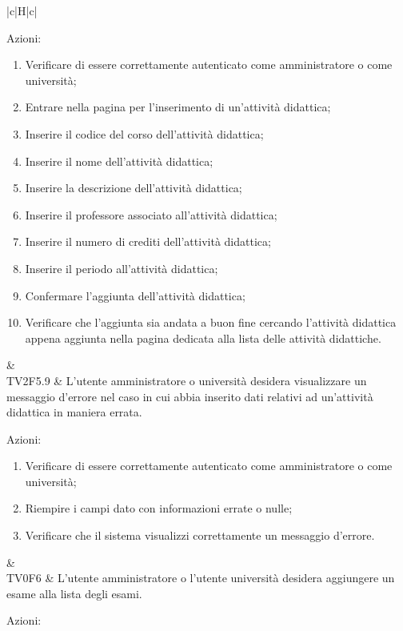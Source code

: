 \begin{longtable}{|c|H|c|}
\begin{flushleft}
		Azioni:\newline
		\end{flushleft} 
		\begin{enumerate}
			\item Verificare di essere correttamente autenticato come amministratore o come università;
			\item Entrare nella pagina per l'inserimento di un'attività didattica;
			\item Inserire il codice del corso dell'attività didattica;
			\item Inserire il nome dell'attività didattica;
			\item Inserire la descrizione dell'attività didattica;
			\item Inserire il professore associato all'attività didattica;
			\item Inserire il numero di crediti dell'attività didattica;
			\item Inserire il periodo all'attività didattica;
			\item Confermare l'aggiunta dell'attività didattica;
			\item Verificare che l'aggiunta sia andata a buon fine cercando l'attività didattica appena aggiunta nella pagina dedicata alla lista delle attività didattiche.
		\end{enumerate} & \Ts \\
	\hline
	TV2F5.9 &  L'utente amministratore o università desidera visualizzare un messaggio d'errore nel caso in cui abbia inserito dati relativi ad un'attività didattica in maniera errata. \newline \begin{flushleft}
		Azioni:\newline
	\end{flushleft} 
	\begin{enumerate}
		\item Verificare di essere correttamente autenticato come amministratore o come università;
		\item Riempire i campi dato con informazioni errate o nulle;
		\item Verificare che il sistema visualizzi correttamente un messaggio d'errore.
	\end{enumerate}  & \Ts \\
	\hline
	TV0F6 & L'utente amministratore o l'utente università desidera aggiungere un esame alla lista degli esami. \newline \begin{flushleft}
		Azioni:\newline

\end{flushleft}
\end{longtable}
